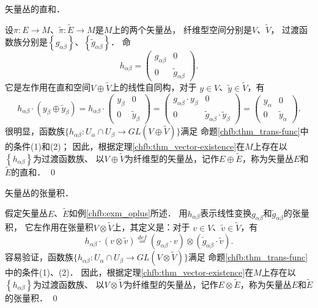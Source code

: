 \begin{example}\label{chfb:exm_oplus}
    矢量丛的直和．
\end{example}
设$\pi: E \rightarrow M$、$\tilde{\pi}: \widetilde{E} \rightarrow M$是$M$上的两个矢量丛，
纤维型空间分别是$V$、$\tilde{V}$，
过渡函数族分别是$\left\{g_{\alpha \beta}\right\}$、$\left\{\tilde{g}_{\alpha \beta}\right\}$． 命
\begin{equation*}
    h_{\alpha \beta}=\begin{pmatrix}
        g_{\alpha \beta} & 0 \\ 0 & \tilde{g}_{\alpha \beta}
    \end{pmatrix}.
\end{equation*}
它是左作用在直和空间$V \oplus \tilde{V}$上的线性自同构，对于 $y \in V$、$ \tilde{y} \in \tilde{V}$，有
\begin{equation*}
    h_{\alpha \beta} \cdot (y_\beta \oplus \tilde{y}_\beta)
    =h_{\alpha \beta} \cdot \begin{pmatrix}
        y_{\beta} & 0 \\ 0 & \tilde{y}_{\beta}
    \end{pmatrix}
    =\begin{pmatrix}
        g_{\alpha \beta}\cdot  y_{\beta} & 0 \\ 0 & \tilde{g}_{\alpha \beta}\cdot  \tilde{y}_{\beta}
    \end{pmatrix}
    =\begin{pmatrix}
        y_{\alpha} & 0 \\ 0 & \tilde{y}_{\alpha}
    \end{pmatrix} .
\end{equation*}
很明显，函数族$\{h_{\alpha \beta}: U_\alpha \cap U_\beta \rightarrow GL(V \oplus \tilde{V})\}$满足
命题\ref{chfb:thm_trans-func}中的条件(1)和(2)；
因此，根据定理\ref{chfb:thm_vector-existence}在$M$上存在以$\left\{h_{\alpha \beta}\right\}$为过渡函数族、
以$V\oplus \tilde{V}$为纤维型的矢量丛，记作$E\oplus\widetilde{E}$，称为矢量丛$E$和$\widetilde{E}$的直和．
\qed

\begin{example}\label{chfb:exm_otimes}
    矢量丛的张量积．
\end{example}
假定矢量丛$E$、$\tilde{E}$如例\ref{chfb:exm_oplus}所述．
用$h_{\alpha \beta}$表示线性变换$g_{\alpha \beta}$和$\tilde{g}_{\alpha \beta}$的张量积，
它左作用在张量积$V \otimes \tilde{V}$上，其定义是：对于 $v \in V$、$ \tilde{v} \in \tilde{V}$，有
\begin{equation*}
    h_{\alpha \beta} \cdot(v \otimes \tilde{v})
    \overset{def}{=}\left(g_{\alpha \beta} \cdot v\right) \otimes
    \left(\tilde{g}_{\alpha \beta} \cdot \tilde{v}\right) .
\end{equation*}
容易验证，函数族$\{h_{\alpha \beta}: U_\alpha \cap U_\beta \rightarrow GL(V \otimes \tilde{V})\}$满足
命题\ref{chfb:thm_trans-func}中的条件(1)、(2)．
因此，根据定理\ref{chfb:thm_vector-existence}在$M$上存在以$\left\{h_{\alpha \beta}\right\}$为过渡函数族、
以$V\otimes\tilde{V}$为纤维型的矢量丛，记作$E \otimes \tilde{E}$，称为矢量丛$E$和$\tilde{E}$ 的张量积．
\qed

